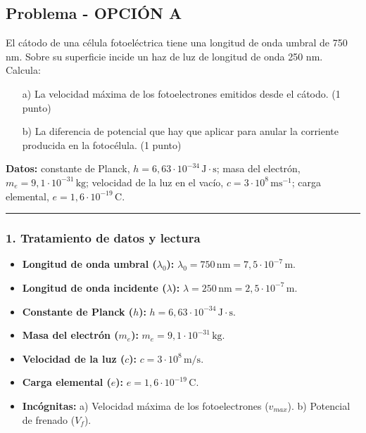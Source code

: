 \subsection{Problema - OPCIÓN A}
\label{subsec:B6A_2017_jun_ord}
\begin{cajaenunciado}
El cátodo de una célula fotoeléctrica tiene una longitud de onda umbral de 750 nm. Sobre su superficie incide un haz de luz de longitud de onda 250 nm. Calcula:
\begin{enumerate}
    \item[a)] La velocidad máxima de los fotoelectrones emitidos desde el cátodo. (1 punto)
    \item[b)] La diferencia de potencial que hay que aplicar para anular la corriente producida en la fotocélula. (1 punto)
\end{enumerate}
\textbf{Datos:} constante de Planck, $h=6,63\cdot10^{-34}\,\text{J}\cdot\text{s}$; masa del electrón, $m_{e}=9,1\cdot10^{-31}\,\text{kg}$; velocidad de la luz en el vacío, $c=3\cdot10^{8}\,\text{ms}^{-1}$; carga elemental, $e=1,6\cdot10^{-19}\,\text{C}$.
\end{cajaenunciado}
\hrule

\subsubsection*{1. Tratamiento de datos y lectura}
\begin{itemize}
    \item \textbf{Longitud de onda umbral ($\lambda_0$):} $\lambda_0 = 750\,\text{nm} = 7,5 \cdot 10^{-7}\,\text{m}$.
    \item \textbf{Longitud de onda incidente ($\lambda$):} $\lambda = 250\,\text{nm} = 2,5 \cdot 10^{-7}\,\text{m}$.
    \item \textbf{Constante de Planck ($h$):} $h = 6,63 \cdot 10^{-34}\,\text{J}\cdot\text{s}$.
    \item \textbf{Masa del electrón ($m_e$):} $m_e = 9,1 \cdot 10^{-31}\,\text{kg}$.
    \item \textbf{Velocidad de la luz ($c$):} $c = 3 \cdot 10^8\,\text{m/s}$.
    \item \textbf{Carga elemental ($e$):} $e = 1,6 \cdot 10^{-19}\,\text{C}$.
    \item \textbf{Incógnitas:} a) Velocidad máxima de los fotoelectrones ($v_{max}$). b) Potencial de frenado ($V_f$).
\end{itemize}

